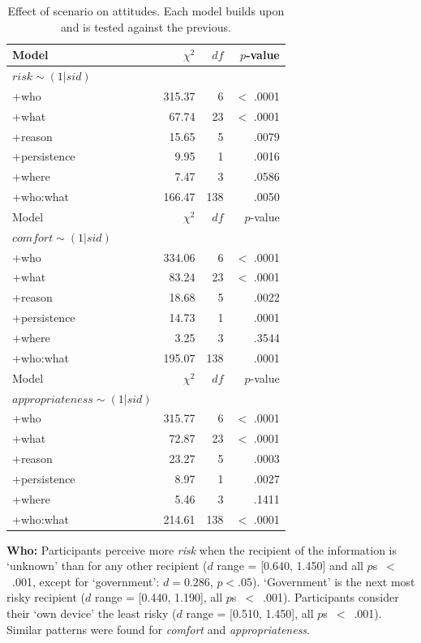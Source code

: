 \begin{table}
	\centering
	\caption{Effect of scenario on attitudes. Each model builds upon and is tested against the previous.}
	\label{tab:anovaEffect}
	\begin{tabular}{ l | r | r | r}
		\hline
		Model &	$\chi^2$ &	$df$ & $p$-value \\ \hline
		$risk\sim(1|sid)$ &				 &			 &						\\ 
		+who &				315.37 &	6 &			$<$ .0001 		\\ 
		+what &			67.74 &		23 &		$<$ .0001 		\\ 
		+reason & 			15.65 &		5 &		.0079 			\\ 
		+persistence &		9.95 &		1 &		.0016 			\\ 
		+where	&			7.47 &		3 &		.0586 			\\ 
		+who:what &		166.47 &	138 &	.0050			\\
		\hline
		Model &	$\chi^2$ &	$df$ & $p$-value \\ \hline
		$comfort\sim(1|sid)$ & 			 &			&	 					\\
		+who &				334.06 &	6 &			$<$ .0001 		\\
		+what &			83.24 &		23 &		$<$ .0001 		\\
		+reason &			18.68 &		5 &			.0022 		\\
		+persistence &		14.73 &		1 &			.0001 		\\
		+where &			3.25 &		3 &			.3544 		\\ 
		+who:what &		195.07 &	138 &		.0001			\\
		\hline
		Model &	$\chi^2$ &	$df$ & $p$-value \\ \hline
		$appropriateness\sim(1|sid)$ &	 &		 &						\\
		+who &				315.77 &	6 &			$<$ .0001 		\\
		+what &			72.87 &		23 &		$<$ .0001 		\\
		+reason &			23.27 &		5 &			.0003 		\\
		+persistence &		8.97 &		1 &			.0027 		\\
		+where &			5.46 &		3 &			.1411 		\\
		+who:what &		214.61 &	138 &		$<$ .0001			\\ 
		\hline
	\end{tabular}
\end{table}

\textbf{Who:} Participants perceive more \emph{risk} when the recipient of the information is `unknown' than for any other recipient ($d$ range = [0.640, 1.450] and all $p$s~$<$~.001, except for `government': $d=0.286$, $p < .05$). `Government' is the next most risky recipient ($d$ range = [0.440, 1.190], all $p$s~$<$~.001). Participants consider their `own device' the least risky ($d$ range = [0.510, 1.450], all $p$s~$<$~.001). Similar patterns were found for \emph{comfort} and \emph{appropriateness}.

